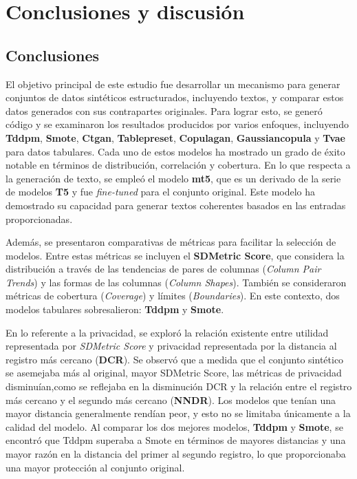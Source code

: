 \chapter{Conclusiones y discusión}

\section{Conclusiones}

El objetivo principal de este estudio fue desarrollar un mecanismo para generar conjuntos de datos sintéticos estructurados, incluyendo textos, y comparar estos datos generados con sus contrapartes originales. Para lograr esto, se generó código y se examinaron los resultados producidos por varios enfoques, incluyendo \textbf{Tddpm}, \textbf{Smote}, \textbf{Ctgan}, \textbf{Tablepreset}, \textbf{Copulagan}, \textbf{Gaussiancopula} y \textbf{Tvae} para datos tabulares. Cada uno de estos modelos ha mostrado un grado de éxito notable en términos de distribución, correlación y cobertura. En lo que respecta a la generación de texto, se empleó el modelo \textbf{mt5}, que es un derivado de la serie de modelos \textbf{T5} y fue \emph{fine-tuned} para el conjunto original. Este modelo ha demostrado su capacidad para generar textos coherentes basados en las entradas proporcionadas.

Además, se presentaron comparativas de métricas para facilitar la selección de modelos. Entre estas métricas se incluyen el \textbf{SDMetric Score}, que considera la distribución a través de las tendencias de pares de columnas (\emph{Column Pair Trends}) y las formas de las columnas (\emph{Column Shapes}). También se consideraron métricas de cobertura (\emph{Coverage}) y límites (\emph{Boundaries}). En este contexto, dos modelos tabulares sobresalieron: \textbf{Tddpm} y \textbf{Smote}.

En lo referente a la privacidad, se exploró la relación existente entre utilidad representada por \emph{SDMetric Score} y privacidad representada por la distancia al registro más cercano (\textbf{DCR}). Se observó que a medida que el conjunto sintético se asemejaba más al original, mayor SDMetric Score, las métricas de privacidad disminuían,como se reflejaba en la disminución DCR y la relación entre el registro más cercano y el segundo más cercano (\textbf{NNDR}). Los modelos que tenían una mayor distancia generalmente rendían peor, y esto no se limitaba únicamente a la calidad del modelo. Al comparar los dos mejores modelos, \textbf{Tddpm} y \textbf{Smote}, se encontró que Tddpm superaba a Smote en términos de mayores distancias y una mayor razón en la distancia del primer al segundo registro, lo que proporcionaba una mayor protección al conjunto original.

